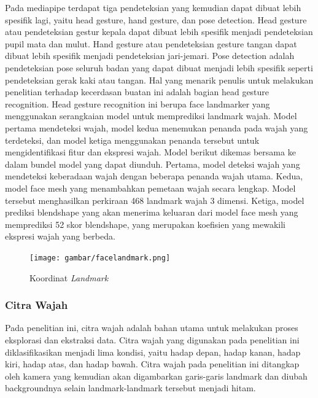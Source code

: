 Pada mediapipe terdapat tiga pendeteksian yang kemudian dapat dibuat lebih spesifik lagi, yaitu head gesture, hand gesture, dan pose detection. Head gesture atau pendeteksian gestur kepala dapat dibuat lebih spesifik menjadi pendeteksian pupil mata dan mulut. Hand gesture atau pendeteksian gesture tangan dapat dibuat lebih spesifik menjadi pendeteksian jari-jemari. Pose detection adalah pendeteksian pose seluruh badan yang dapat dibuat menjadi lebih spesifik seperti pendeteksian gerak kaki atau tangan. Hal yang menarik penulis untuk melakukan penelitian terhadap kecerdasan buatan ini adalah bagian head gesture recognition. Head gesture recognition ini berupa face landmarker yang menggunakan serangkaian model untuk memprediksi landmark wajah. Model pertama mendeteksi wajah, model kedua menemukan penanda pada wajah yang terdeteksi, dan model ketiga menggunakan penanda tersebut untuk mengidentifikasi fitur dan ekspresi wajah. Model berikut dikemas bersama ke dalam bundel model yang dapat diunduh. Pertama, model deteksi wajah yang mendeteksi keberadaan wajah dengan beberapa penanda wajah utama. Kedua, model face mesh yang menambahkan pemetaan wajah secara lengkap. Model tersebut menghasilkan perkiraan 468 landmark wajah 3 dimensi. Ketiga, model prediksi blendshape yang akan menerima keluaran dari model face mesh yang memprediksi 52 skor blendshape, yang merupakan koefisien yang mewakili ekspresi wajah yang berbeda\parencite{MediaPipe2023}.

\begin{figure} [H] \centering
  \texttt{[image: gambar/facelandmark.png]}
  \caption{Koordinat \emph{Landmark }}
  \label{fig:Blueprint}
\end{figure}

\subsubsection{Citra Wajah}
Pada penelitian ini, citra wajah adalah bahan utama untuk melakukan proses eksplorasi dan ekstraksi data. Citra wajah yang digunakan pada penelitian ini diklasifikasikan menjadi lima kondisi, yaitu hadap depan, hadap kanan, hadap kiri, hadap atas, dan hadap bawah. Citra wajah pada penelitian ini ditangkap oleh kamera yang kemudian akan digambarkan garis-garis landmark dan diubah backgroundnya selain landmark-landmark tersebut menjadi hitam.

